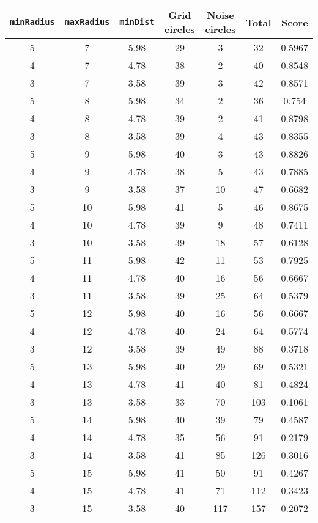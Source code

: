 \documentclass[letterpaper, 12pt]{article}
\begin{document}
\begin{longtable}{|c|c|c|c|c|c|c|}
\hline
\textbf{\texttt{minRadius}} & \textbf{\texttt{maxRadius}} & \textbf{\texttt{minDist}} & \textbf{Grid circles} & \textbf{Noise circles} & \textbf{Total} & \textbf{Score} \\
\hline
5 & 7 & 5.98 & 29 & 3 & 32 & 0.5967 \\
\hline
4 & 7 & 4.78 & 38 & 2 & 40 & 0.8548 \\
\hline
3 & 7 & 3.58 & 39 & 3 & 42 & 0.8571 \\
\hline
5 & 8 & 5.98 & 34 & 2 & 36 & 0.754 \\
\hline
4 & 8 & 4.78 & 39 & 2 & 41 & 0.8798 \\
\hline
3 & 8 & 3.58 & 39 & 4 & 43 & 0.8355 \\
\hline
5 & 9 & 5.98 & 40 & 3 & 43 & 0.8826 \\
\hline
4 & 9 & 4.78 & 38 & 5 & 43 & 0.7885 \\
\hline
3 & 9 & 3.58 & 37 & 10 & 47 & 0.6682 \\
\hline
5 & 10 & 5.98 & 41 & 5 & 46 & 0.8675 \\
\hline
4 & 10 & 4.78 & 39 & 9 & 48 & 0.7411 \\
\hline
3 & 10 & 3.58 & 39 & 18 & 57 & 0.6128 \\
\hline
5 & 11 & 5.98 & 42 & 11 & 53 & 0.7925 \\
\hline
4 & 11 & 4.78 & 40 & 16 & 56 & 0.6667 \\
\hline
3 & 11 & 3.58 & 39 & 25 & 64 & 0.5379 \\
\hline
5 & 12 & 5.98 & 40 & 16 & 56 & 0.6667 \\
\hline
4 & 12 & 4.78 & 40 & 24 & 64 & 0.5774 \\
\hline
3 & 12 & 3.58 & 39 & 49 & 88 & 0.3718 \\
\hline
5 & 13 & 5.98 & 40 & 29 & 69 & 0.5321 \\
\hline
4 & 13 & 4.78 & 41 & 40 & 81 & 0.4824 \\
\hline
3 & 13 & 3.58 & 33 & 70 & 103 & 0.1061 \\
\hline
5 & 14 & 5.98 & 40 & 39 & 79 & 0.4587 \\
\hline
4 & 14 & 4.78 & 35 & 56 & 91 & 0.2179 \\
\hline
3 & 14 & 3.58 & 41 & 85 & 126 & 0.3016 \\
\hline
5 & 15 & 5.98 & 41 & 50 & 91 & 0.4267 \\
\hline
4 & 15 & 4.78 & 41 & 71 & 112 & 0.3423 \\
\hline
3 & 15 & 3.58 & 40 & 117 & 157 & 0.2072 \\

\end{longtable}
\end{document}
